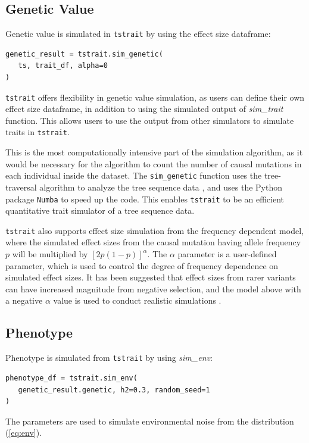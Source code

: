 \documentclass[unnumsec,webpdf,modern,large,namedate]{oup-authoring-template}%
\theoremstyle{thmstyleone}%
\theoremstyle{thmstyletwo}%
\theoremstyle{thmstylethree}%
\begin{document}
\subsection{Genetic Value}

Genetic value is simulated in \texttt{tstrait} by using the effect size dataframe:
\begin{verbatim}
genetic_result = tstrait.sim_genetic(
   ts, trait_df, alpha=0
)
\end{verbatim}
\texttt{tstrait} offers flexibility in genetic value simulation, as users can
define their own effect size dataframe, in addition to using the simulated
output of \emph{sim\_trait} function. This allows users to use the output from
other simulators to simulate traits in \texttt{tstrait}.

This is the most computationally intensive part of the simulation algorithm, as
it would be necessary for the algorithm to count the number of causal mutations
in each individual inside the dataset. The \texttt{sim\_genetic} function uses
the tree-traversal algorithm to analyze the tree sequence data
\citep{ralph2020}, and uses the Python package \texttt{Numba} \citep{numba} to
speed up the code. This enables \texttt{tstrait} to be an efficient
quantitative trait simulator of a tree sequence data.

\texttt{tstrait} also supports effect size simulation from the frequency
dependent model, where the simulated effect sizes from the causal mutation
having allele frequency $p$ will be multiplied by $[2p(1-p)]^\alpha$. The
$\alpha$ parameter is a user-defined parameter, which is used to control the
degree of frequency dependence on simulated effect sizes. It has been suggested
that effect sizes from rarer variants can have increased magnitude from
negative selection, and the model above with a negative $\alpha$ value is used
to conduct realistic simulations \citep{speed2017}.

\subsection{Phenotype}

Phenotype is simulated from \texttt{tstrait} by using \emph{sim\_env}:
\begin{verbatim}
phenotype_df = tstrait.sim_env(
   genetic_result.genetic, h2=0.3, random_seed=1
)
\end{verbatim}
The parameters are used to simulate environmental noise from the distribution (\ref{eq:env}).
\end{document}
